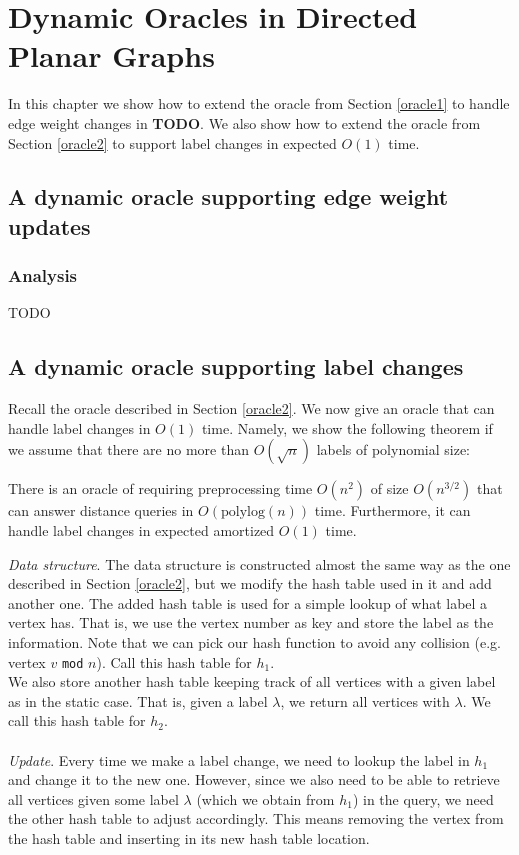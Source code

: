 \section{Dynamic Oracles in Directed Planar Graphs}\label{oracle3}
In this chapter we show how to extend the oracle from Section \ref{oracle1} to handle
edge weight changes in \textbf{TODO}. We also show how to extend the oracle from Section
\ref{oracle2} to support label changes in expected $O(1)$ time.

\subsection{A dynamic oracle supporting edge weight updates}\label{oracle3}


\subsubsection{Analysis}
TODO

\subsection{A dynamic oracle supporting label changes}\label{oracle4}
Recall the oracle described in Section \ref{oracle2}. We now give an oracle that can
handle label changes in $O(1)$ time. Namely, we show the following theorem if we assume
that there are no more than $O(\sqrt{n})$ labels of polynomial size:
\begin{thm}\label{thm3}
  There is an oracle of requiring preprocessing time $O(n^2)$ of size $O(n^{3/2})$ that
  can answer distance queries in $O(\text{polylog}(n))$ time. Furthermore, it can handle
  label changes in expected amortized $O(1)$ time.
\end{thm}
\textit{Data structure}.
The data structure is constructed almost the same way as the one described in Section
\ref{oracle2}, but we modify the hash table used in it and add another one. The added
hash table is used for a simple lookup of what label a vertex has. That is, we use the
vertex number as key and store the label as the information. Note that we can pick our
hash function to avoid any collision (e.g. vertex $v$ \texttt{mod} $n$). Call this hash
table for $h_1$. \\
We also store another hash table keeping track of all vertices with a given label as in
the static case. That is, given a label $\lambda$, we return all vertices with $\lambda$.
We call this hash table for $h_2$. \\
\\
\indent\textit{Update}.
Every time we make a label change, we need to lookup the label in $h_1$ and change
it to the new one. However, since we also need to be able to retrieve all vertices given some label
$\lambda$ (which we obtain from $h_1$) in the query, we need the other hash table to adjust accordingly. This means
removing the vertex from the hash table and inserting in its new hash table location.

